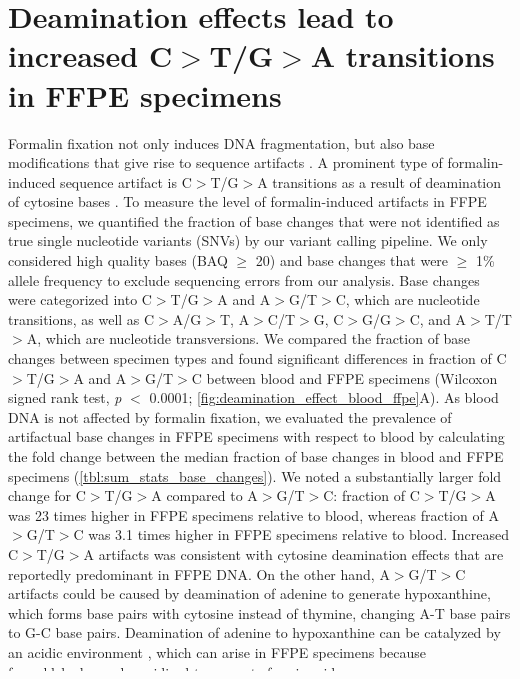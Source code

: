 \newpage
\section{Deamination effects lead to increased C$>$T/G$>$A transitions in FFPE specimens}
\label{sec:DeaminationeffectsleadtoincreasedC$>$T/G$>$AtransitionsinFFPEspecimens}

Formalin fixation not only induces DNA fragmentation, but also base modifications that give rise to sequence artifacts \cite{Do2012, Do2013, Do2015a, Kim2017, Hofreiter2001, Wong2014, Ofner2017, Oh2015}. A prominent type of formalin-induced sequence artifact is C$>$T/G$>$A transitions as a result of deamination of cytosine bases \cite{Do2015a, Kim2017, Wong2014, Oh2015, Lin2014}. To measure the level of formalin-induced artifacts in FFPE specimens, we quantified the fraction of base changes that were not identified as true single nucleotide variants (\acs{SNV}s) by our variant calling pipeline. We only considered high quality bases (BAQ $\geq$ 20) and base changes that were $\geq$ 1\% allele frequency to exclude sequencing errors from our analysis. Base changes were categorized into C$>$T/G$>$A and A$>$G/T$>$C, which are nucleotide transitions, as well as C$>$A/G$>$T, A$>$C/T$>$G, C$>$G/G$>$C, and A$>$T/T$>$A, which are nucleotide transversions. We compared the fraction of base changes between specimen types and found significant differences in fraction of C$>$T/G$>$A and A$>$G/T$>$C between blood and FFPE specimens (Wilcoxon signed rank test, \textit{p} $<$ 0.0001; \autoref{fig:deamination_effect_blood_ffpe}A). As blood DNA is not affected by formalin fixation, we evaluated the prevalence of artifactual base changes in FFPE specimens with respect to blood by calculating the fold change between the median fraction of base changes in blood and FFPE specimens (\autoref{tbl:sum_stats_base_changes}). We noted a substantially larger fold change for C$>$T/G$>$A compared to A$>$G/T$>$C: fraction of C$>$T/G$>$A was 23 times higher in FFPE specimens relative to blood, whereas fraction of A$>$G/T$>$C was 3.1 times higher in FFPE specimens relative to blood. Increased C$>$T/G$>$A artifacts was consistent with cytosine deamination effects that are reportedly predominant in FFPE DNA. On the other hand, A$>$G/T$>$C artifacts could be caused by deamination of adenine to generate hypoxanthine, which forms base pairs with cytosine instead of thymine, changing A-T base pairs to G-C base pairs. Deamination of adenine to hypoxanthine can be catalyzed by an acidic environment \cite{Wang2010}, which can arise in FFPE specimens because formaldehyde can be oxidized to generate formic acid \cite{Do2015a}.

